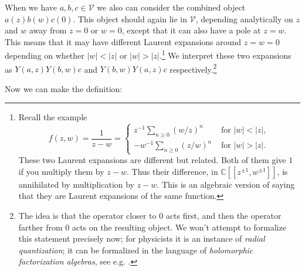 \documentclass[12pt,letterpaper,reqno]{amsart}
\numberwithin{equation}{section}
\newcommand{\bbC}{\ensuremath{\mathbb C}}
\newcommand{\vertex}{\mathcal{V}}
\newcommand{\vrep}{\mathcal{R}}
\newcommand{\abs}[1]{\lvert#1\rvert}
\newcommand{\ti}[1]{\textit{#1}}
\begin{document}

When we have $a, b, c \in \vertex$ we also can consider
the combined object $a(z) b(w) c(0)$. This 
object should again lie in $\vertex$, depending
analytically on $z$ and $w$ away from $z = 0$ or $w = 0$, 
except that it can also have a pole at $z = w$.
This means that it may have different Laurent expansions
around $z = w = 0$ depending on whether
$\abs{w} < \abs{z}$ or $\abs{w} > \abs{z}$.\footnote{Recall the example
\begin{equation}
 f(z,w) = \frac{1}{z-w} = \begin{cases} z^{-1} \sum_{n \ge 0} (w/z)^n & \text{ for } \abs{w} < \abs{z}, \\ -w^{-1} \sum_{n \ge 0} (z/w)^n & \text{ for } \abs{w} > \abs{z}. \end{cases}
\end{equation}
These two Laurent expansions are different but related.
Both of them give $1$ if you multiply them by $z-w$.
Thus their difference, in $\bbC[[z^{\pm 1}, w^{\pm 1}]]$, 
is annihilated by multiplication by $z-w$.
This is an algebraic version of saying that they are
Laurent expansions of the same function.
}
We interpret these two expansions as $Y(a,z) Y(b,w) c$ and $Y(b,w) Y(a,z) c$ respectively.\footnote{
The idea is that the operator closer to $0$ acts first,
and then the operator farther from $0$ acts on the 
resulting object. We won't attempt to formalize this statement
precisely now; for physicists it is an instance of \ti{radial quantization}; it can be formalized in the language of \ti{holomorphic factorization algebras}, see e.g. \cite{CostelloGwilliam2021FA2}.}

Now we can make the definition:
\end{document}

